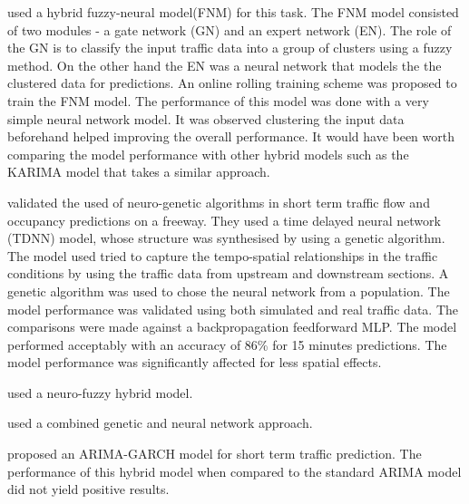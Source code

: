 \citet{yin2002urban} used a hybrid fuzzy-neural model(FNM) for this task. The FNM model consisted of
two modules - a gate network (GN) and an expert network (EN). The role of the GN is to classify the
input traffic data into a group of clusters using a fuzzy method. On the other hand the EN was a
neural network that models the the clustered data for predictions. An online rolling training scheme
was proposed to train the FNM model. The performance of this model was done with a very simple neural
network model. It was observed clustering the input data beforehand helped improving the overall
performance. It would have been worth comparing the model performance with other hybrid models such
as the KARIMA model that takes a similar approach.

\cite{abdulhai2002short} validated the used of neuro-genetic algorithms in short term traffic flow and
occupancy predictions on a freeway. They used a time delayed neural network (TDNN) model, whose
structure was synthesised by using a genetic algorithm. The model used tried to capture the
tempo-spatial relationships in the traffic conditions by using the traffic data from upstream and
downstream sections. A genetic algorithm was used to chose the neural network from a population. The
model performance was validated using both simulated and real traffic data. The comparisons were made
against a backpropagation feedforward MLP. The model performed acceptably with an accuracy of 86\% for
15 minutes predictions. The model performance was significantly affected for less spatial effects.

\citet{ishak2004optimizing} used a neuro-fuzzy hybrid model.

\citet{vlahogianni2005optimized} used a combined genetic and neural network approach.

\citet{chen2011short} proposed an ARIMA-GARCH model for short term traffic prediction. The
performance of this hybrid model when compared to the standard ARIMA model did not yield positive
results.


